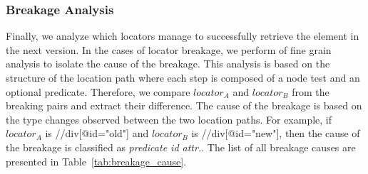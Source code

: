 \subsubsection{Breakage Analysis}
\label{sec:hpath-protocol-breakage-analysis}

Finally, we analyze which locators manage to successfully retrieve the element in the next version. In the cases of locator breakage, we perform of fine grain analysis to isolate the cause of the breakage. This analysis is based on the structure of the location path where each step is composed of a node test and an optional predicate. Therefore, we compare $locator_A$ and $locator_B$ from the breaking pairs and extract their difference. The cause of the breakage is based on the type changes observed between the two location paths. For example, if $locator_A$ is //div[@id="old"] and $locator_B$ is //div[@id="new"], then the cause of the breakage is classified as \emph{predicate id attr.}. The list of all breakage causes are presented in Table~\ref{tab:breakage_cause}. 